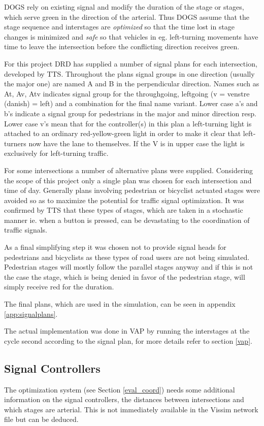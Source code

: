 DOGS rely on existing signal and modify the duration of the stage or stages, which serve green in the direction of the arterial. Thus DOGS assume that the stage sequence and interstages are \textit{optimized} so that the time lost in stage changes is minimized and \textit{safe} so that vehicles in eg. left-turning movements have time to leave the intersection before the conflicting direction receives green.

For this project DRD has supplied a number of signal plans for each intersection, developed by TTS. Throughout the plans signal groups in one direction (usually the major one) are named A and B in the perpendicular direction. Names such as At, Av, Atv indicates signal group for the throughgoing, leftgoing (v = venstre (danish) = left) and a combination for the final name variant. Lower case a's and b's indicate a signal group for pedestrians in the major and minor direction resp. Lower case v's mean that for the controller(s) in this plan a left-turning light is attached to an ordinary red-yellow-green light in order to make it clear that left-turners now have the lane to themselves. If the V is in upper case the light is exclusively for left-turning traffic.

For some intersections a number of alternative plans were supplied. Considering the scope of this project only a single plan was chosen for each intersection and time of day. Generally plans involving pedestrian or bicyclist actuated stages were avoided so as to maximize the potential for traffic signal optimization. It was confirmed by TTS that these types of stages, which are taken in a stochastic manner ie. when a button is pressed, can be devastating to the coordination of traffic signals.

As a final simplifying step it was chosen not to provide signal heads for pedestrians and bicyclists as these types of road users are not being simulated. Pedestrian stages will mostly follow the parallel stages anyway and if this is not the case the stage, which is being denied in favor of the pedestrian stage, will simply receive red for the duration.

The final plans, which are used in the simulation, can be seen in appendix \ref{app:signalplans}.

The actual implementation was done in VAP by running the interstages at the cycle second according to the signal plan, for more details refer to section \ref{vap}.

\subsection{Signal Controllers}
\label{signal_details}
The optimization system (see Section \ref{eval_coord}) needs some additional information on the signal controllers, the distances between intersections and which stages are arterial. This is not immediately available in the Vissim network file but can be deduced.

